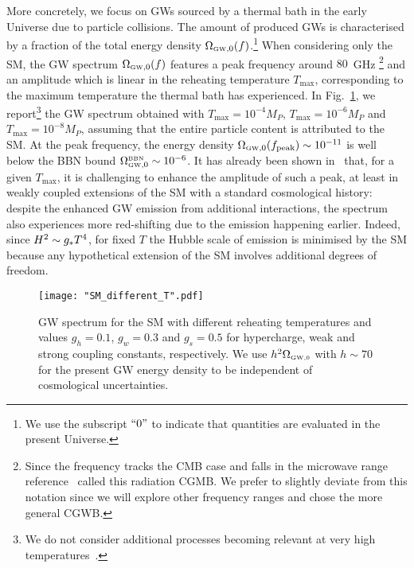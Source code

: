 \documentclass[a4paper,11pt]{article}
\newcommand{\tti}[1]{\text{\tiny{#1}}}
\begin{document}
More concretely, we focus on GWs sourced by a thermal bath in the early Universe due to particle collisions.
The amount of produced GWs is characterised by a fraction of the total energy density $\Omega_{\text{\tiny{GW}}, 0}(f)$.\footnote{We use the subscript $``0"$ to indicate that quantities are evaluated in the present Universe.}
When considering only the SM, the GW spectrum $\Omega_{\text{\tiny{GW}}, 0}(f)$ features a peak frequency around $80 \, $ GHz \footnote{Since the frequency tracks the CMB case and falls in the microwave range reference~\cite{Ringwald:2020ist} called this radiation CGMB. We prefer to slightly deviate from this notation since we will explore other frequency ranges and chose the more general CGWB. } and an amplitude which is linear in the reheating temperature $T_{\text{max}}$, corresponding to the maximum temperature the thermal bath has experienced.
In Fig.~\ref{fig:SMcase}, we report\footnote{We do not consider additional processes becoming relevant at very high temperatures~\cite{Ghiglieri:2022rfp}.} the GW spectrum obtained with $T_{\text{max}}=10^{-4}M_{P}, \, T_{\text{max}}=10^{-6}M_{P}$ and $T_{\text{max}}=10^{-8}M_{P}$, assuming that the entire particle content is attributed to the SM.
At the peak frequency, the energy density $\Omega_{\text{\tiny{GW}},0} (f_{\rm peak}) \sim 10^{-11}$ is well below the BBN bound $\Omega_{\text{\tiny{GW}},0}^{\text{\tiny{BBN}}} \sim 10^{-6}$.
It has already been shown in~\cite{Ringwald:2020ist} that, for a given $T_{\text{max}}$, it is challenging to enhance the amplitude of such a peak, at least in weakly coupled extensions of the SM with a standard cosmological history: despite the enhanced GW emission from additional interactions, the spectrum also experiences more red-shifting due to the emission happening earlier.
Indeed, since $H^2\sim g_{\tiny{*}} T^4$, for fixed $T$ the Hubble scale of emission is minimised by the SM because any hypothetical extension of the SM involves additional degrees of freedom. 

\begin{figure}[t!]
\centerline{\texttt{[image: "SM\_different\_T".pdf]}}
\caption{GW spectrum for the SM with different reheating temperatures and values $g_{h}=0.1$, $g_{w}=0.3$ and $g_{s}=0.5$ for hypercharge, weak and strong coupling constants, respectively.
We use $h^2\Omega_\tti{GW,0}$ with $h\sim 70$ for the present GW energy density to be independent of cosmological uncertainties.}
\label{fig:SMcase}
\end{figure}
\end{document}
